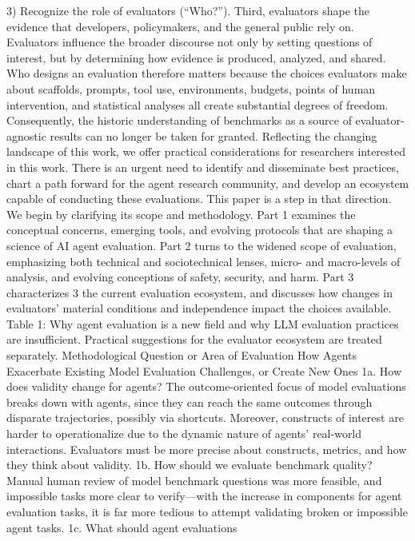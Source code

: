 3) Recognize the role of evaluators (“Who?”). Third, evaluators shape the evidence that developers,
policymakers, and the general public rely on. Evaluators influence the broader discourse not only by setting
questions of interest, but by determining how evidence is produced, analyzed, and shared. Who designs
an evaluation therefore matters because the choices evaluators make about scaffolds, prompts, tool use,
environments, budgets, points of human intervention, and statistical analyses all create substantial degrees
of freedom. Consequently, the historic understanding of benchmarks as a source of evaluator-agnostic
results can no longer be taken for granted. Reflecting the changing landscape of this work, we offer practical
considerations for researchers interested in this work.
There is an urgent need to identify and disseminate best practices, chart a path forward for the agent
research community, and develop an ecosystem capable of conducting these evaluations. This paper is a
step in that direction. We begin by clarifying its scope and methodology. Part 1 examines the conceptual
concerns, emerging tools, and evolving protocols that are shaping a science of AI agent evaluation. Part 2
turns to the widened scope of evaluation, emphasizing both technical and sociotechnical lenses, micro-
and macro-levels of analysis, and evolving conceptions of safety, security, and harm. Part 3 characterizes
3
the current evaluation ecosystem, and discusses how changes in evaluators’ material conditions and
independence impact the choices available.
Table 1: Why agent evaluation is a new field and why LLM evaluation practices are insufficient. Practical suggestions
for the evaluator ecosystem are treated separately.
Methodological Question or Area of
Evaluation
How Agents Exacerbate Existing Model Evaluation Challenges, or
Create New Ones
1a. How does validity change for
agents?
The outcome-oriented focus of model evaluations breaks down with
agents, since they can reach the same outcomes through disparate
trajectories, possibly via shortcuts. Moreover, constructs of interest are
harder to operationalize due to the dynamic nature of agents’ real-world
interactions. Evaluators must be more precise about constructs, metrics,
and how they think about validity.
1b. How should we evaluate
benchmark quality?
Manual human review of model benchmark questions was more feasible,
and impossible tasks more clear to verify—with the increase in
components for agent evaluation tasks, it is far more tedious to attempt
validating broken or impossible agent tasks.
1c. What should agent evaluations
